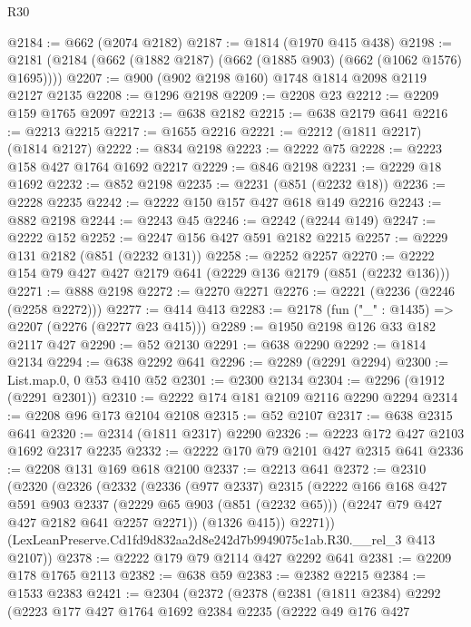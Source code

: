 \begin{lexlean}{R30}
\begin{coremodule}
@2184 := @662 (@2074 @2182)
@2187 := @1814 (@1970 @415 @438)
@2198 := @2181 (@2184 (@662 (@1882 @2187) (@662 (@1885 @903) (@662 (@1062 @1576) @1695))))
@2207 := @900 (@902 @2198 @160) @1748 @1814 @2098 @2119 @2127 @2135
@2208 := @1296 @2198
@2209 := @2208 @23
@2212 := @2209 @159 @1765 @2097
@2213 := @638 @2182
@2215 := @638 @2179 @641
@2216 := @2213 @2215
@2217 := @1655 @2216
@2221 := @2212 (@1811 @2217) (@1814 @2127)
@2222 := @834 @2198
@2223 := @2222 @75
@2228 := @2223 @158 @427 @1764 @1692 @2217
@2229 := @846 @2198
@2231 := @2229 @18 @1692
@2232 := @852 @2198
@2235 := @2231 (@851 (@2232 @18))
@2236 := @2228 @2235
@2242 := @2222 @150 @157 @427 @618 @149 @2216
@2243 := @882 @2198
@2244 := @2243 @45
@2246 := @2242 (@2244 @149)
@2247 := @2222 @152
@2252 := @2247 @156 @427 @591 @2182 @2215
@2257 := @2229 @131 @2182 (@851 (@2232 @131))
@2258 := @2252 @2257
@2270 := @2222 @154 @79 @427 @427 @2179 @641 (@2229 @136 @2179 (@851 (@2232 @136)))
@2271 := @888 @2198
@2272 := @2270 @2271
@2276 := @2221 (@2236 (@2246 (@2258 @2272)))
@2277 := @414 @413
@2283 := @2178 (fun ("_" : @1435) => @2207 (@2276 (@2277 @23 @415)))
@2289 := @1950 @2198 @126 @33 @182 @2117 @427
@2290 := @52 @2130
@2291 := @638 @2290
@2292 := @1814 @2134
@2294 := @638 @2292 @641
@2296 := @2289 (@2291 @2294)
@2300 := List.map.{0, 0} @53 @410 @52
@2301 := @2300 @2134
@2304 := @2296 (@1912 (@2291 @2301))
@2310 := @2222 @174 @181 @2109 @2116 @2290 @2294
@2314 := @2208 @96 @173 @2104 @2108
@2315 := @52 @2107
@2317 := @638 @2315 @641
@2320 := @2314 (@1811 @2317) @2290
@2326 := @2223 @172 @427 @2103 @1692 @2317 @2235
@2332 := @2222 @170 @79 @2101 @427 @2315 @641
@2336 := @2208 @131 @169 @618 @2100
@2337 := @2213 @641
@2372 := @2310
    (@2320
      (@2326
        (@2332
          (@2336
            (@977 @2337)
            @2315
            (@2222
              @166
              @168
              @427
              @591
              @903
              @2337
              (@2229 @65 @903 (@851 (@2232 @65)))
              (@2247 @79 @427 @427 @2182 @641 @2257 @2271))
            (@1326 @415))
          @2271))
      (LexLeanPreserve.Cd1fd9d832aa2d8e242d7b9949075c1ab.R30.__rel_3 @413 @2107))
@2378 := @2222 @179 @79 @2114 @427 @2292 @641
@2381 := @2209 @178 @1765 @2113
@2382 := @638 @59
@2383 := @2382 @2215
@2384 := @1533 @2383
@2421 := @2304
    (@2372
      (@2378
        (@2381
          (@1811 @2384)
          @2292
          (@2223
            @177
            @427
            @1764
            @1692
            @2384
            @2235
            (@2222
              @49
              @176
              @427

\end{coremodule}
\end{lexlean}
